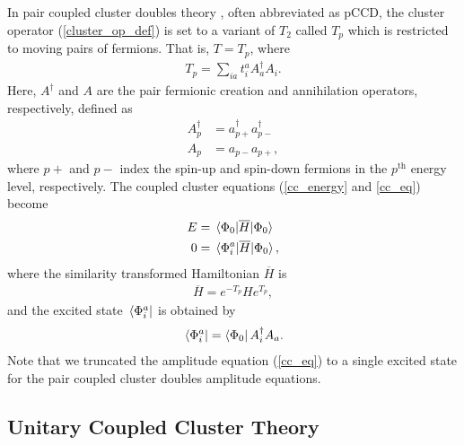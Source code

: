 \documentclass[10pt]{article}
\begin{document}
In pair coupled cluster doubles theory \cite{ref:pccd}, often abbreviated as pCCD, the cluster operator (\ref{cluster_op_def}) is set to a variant of $T_2$ called $T_p$ which is restricted to moving pairs of fermions. That is, $T=T_p$, where
\begin{align}
\label{T_p}
T_p=\sum_{ia}t^a_iA^\dagger_aA_i
.\end{align}
Here, $A^\dagger$ and $A$ are the pair fermionic creation and annihilation operators, respectively, defined as
\begin{align}
\label{pair_op_def}
A^{\dagger}_p &= a^{\dagger}_{p+}a^{\dagger}_{p-}
\\
A_p &= a_{p-}a_{p+}
,\end{align}
where $p+$ and $p-$ index the spin-up and spin-down fermions in the $p^{\text{th}}$ energy level, respectively. The coupled cluster equations (\ref{cc_energy} and \ref{cc_eq}) become
\begin{align}
\label{pccd_energy}
E&=\mel{\Phi_0}{\overline{H}}{\Phi_0}
\\
\label{pccd_eq}
0&=\mel{\Phi_i^a}{\overline{H}}{\Phi_0}
,\end{align}
where the similarity transformed Hamiltonian $\overline{H}$ is
\begin{align}
\overline{H}=e^{-T_p}He^{T_p}
,\end{align}
and the excited state $\bra*{\Phi_i^a}$ is obtained by
\begin{align}
\bra*{\Phi_i^a}=\bra{\Phi_0}A^\dagger_iA_a
.\end{align}
Note that we truncated the amplitude equation (\ref{cc_eq}) to a single excited state for the pair coupled cluster doubles amplitude equations.

\subsection{Unitary Coupled Cluster Theory}
\end{document}
